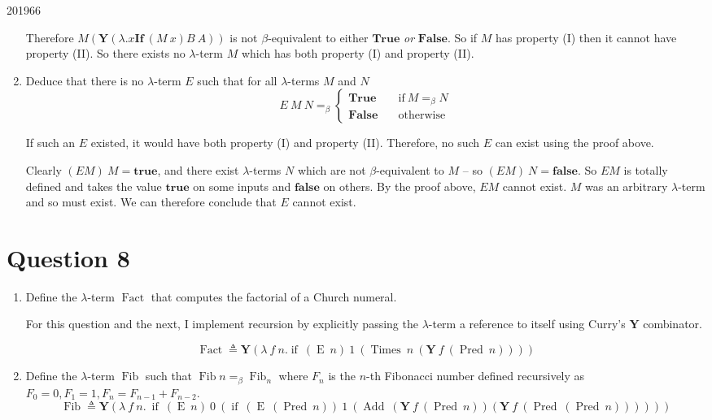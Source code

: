 \documentclass[10pt,\jkfside,a4paper]{article}
\begin{document}
\begin{examquestion}{2019}{6}{6}
\begin{enumerate}
\begin{itemize}
\end{itemize}

Therefore $M (\mathbf{Y}(\lambda. x \mathbf{If}\ (M\ x)B\ A))$ is not
$\beta$-equivalent to either $\mathbf{True}$ \textit{or} $\mathbf{False}$.
So if $M$ has property (I) then it cannot have property (II). So there
exists no $\lambda$-term $M$ which has both property (I) and property (II).

\item Deduce that there is no $\lambda$-term $E$ such that for all
$\lambda$-terms $M$ and $N$
\[
E\ M\ N =_{\beta}
\begin{cases}
\mathbf{True} & \quad \text{if}\ M =_{\beta} N \\
\mathbf{False} & \quad \text{otherwise}
\end{cases}
\]

If such an $E$ existed, it would have both property (I) and property (II).
Therefore, no such $E$ can exist using the proof above.

Clearly $(E M)\ M = \mathbf{true}$, and there exist $\lambda$-terms $N$
which are not $\beta$-equivalent to $M$ -- so $(E M)\ N = \mathbf{false}$.
So $EM$ is totally defined and takes the value $\mathbf{true}$ on some
inputs and $\mathbf{false}$ on others. By the proof above, $EM$ cannot
exist. $M$ was an arbitrary $\lambda$-term and so must exist.
We can therefore conclude that $E$ cannot exist.

\end{enumerate}

\end{examquestion}

\section{Question 8}

\begin{enumerate}[label=(\alph*)]

\item Define the $\lambda$-term $\mathop{Fact}$ that computes the factorial
of a Church numeral.

For this question and the next, I implement recursion by explicitly
passing the $\lambda$-term a reference to itself using Curry's $\mathbf{Y}$
combinator.

\[
\mathop{Fact} \triangleq
\mathbf{Y}(\lambda \ f\  n. \mathop{if}\ (\mathop{Eq_0}\ n)\ 1\
(\mathop{Times}\ n\ (\mathbf{Y}\ f\ (\mathop{Pred}\ n))))
\]

\item Define the $\lambda$-term $\mathop{Fib}$ such that
$\mathop{Fib} n =_\beta \mathop{Fib}_n$ where $F_n$ is the $n$-th Fibonacci
number defined recursively as $F_0 = 0, F_1=1, F_n = F_{n-1} + F_{n-2}$.
\[
\mathop{Fib} \triangleq \mathbf{Y} (
\lambda\ f\ n.\ \mathop{if}\ (\mathop{Eq_0}\ n)\ 0\
(
	\mathop{if}\ (\mathop{Eq_0}\ (\mathop{Pred}\ n))\ 1\
	(\mathop{Add}\
		(\mathbf{Y}\ f\ (\mathop{Pred}\ n))
		(\mathbf{Y}\ f\ (\mathop{Pred}\ (\mathop{Pred}\ n)))
	)
)
)
\]

\end{enumerate}
\end{document}
